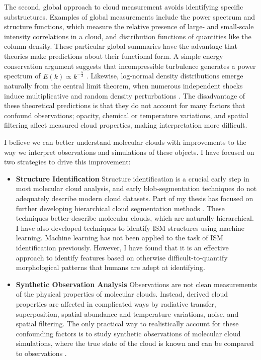The second, global approach to cloud measurement avoids identifying specific substructures. Examples of global measurements include the power spectrum and structure functions, which measure the relative presence of large- and small-scale intensity correlations in a cloud, and distribution functions of quantities like the column density. These particular global summaries have the advantage that theories make predictions about their functional form. A simple energy conservation argument suggests that incompressible turbulence generates a power spectrum of $E(k) \propto k^{-\frac{5}{3}}$  \citep{Elmegreen04}. Likewise, log-normal density distributions emerge naturally from the central limit theorem, when numerous independent shocks induce multiplicative and random density perturbations \citep{Vaz01}. The disadvantage of these theoretical predictions is that they do not account for many factors that confound observations; opacity, chemical or temperature variations, and spatial filtering affect measured cloud properties, making interpretation more difficult.

I believe we can better understand molecular clouds with improvements to the way we interpret observations and simulations of these objects. I have focused on two strategies to drive this improvement:

\begin{itemize}
\item{\textbf{Structure Identification}} Structure identification is a crucial early step in most molecular cloud analysis, and early blob-segmentation techniques do not adequately describe modern cloud datasets. Part of my thesis has focused on further developing hierarchical cloud segmentation methods \citep{Rosolowsky08}. These techniques better-describe molecular clouds, which are naturally hierarchical. I have also developed techniques to identify ISM structures using machine learning. Machine learning has not been applied to the task of ISM identification previously. However, I have found that it is an effective approach to identify features based on otherwise difficult-to-quantify morphological patterns that humans are adept at identifying.
\item{\textbf{Synthetic Observation Analysis}} Observations are not clean measurements of the physical properties of molecular clouds. Instead, derived cloud properties are affected in complicated ways by radiative transfer, superposition, spatial abundance and temperature variations, noise, and spatial filtering. The only practical way to realistically account for these confounding factors is to study synthetic observations of molecular cloud simulations, where the true state of the cloud is known and can be compared to observations \citep{Goodman11}. 
\end{itemize}


